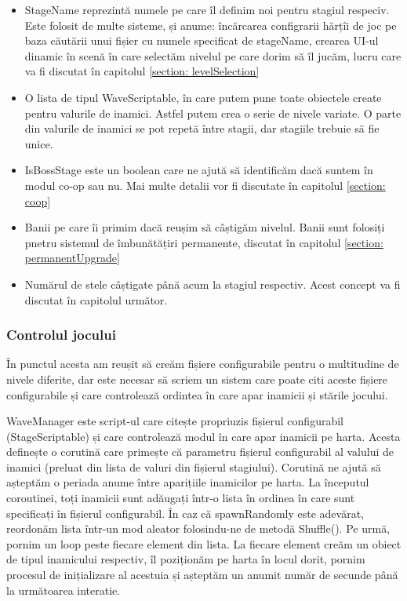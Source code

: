 \documentclass[12pt, a4paper]{article}
\begin{document}
	\begin{itemize}
		\item StageName reprezintă numele pe care îl definim noi pentru stagiul respeciv. Este folosit de multe sisteme, și anume: încărcarea configrarii hărțîi de joc pe baza căutării unui fișier cu numele specificat de stageName, crearea UI-ul dinamic în scenă în care selectăm nivelul pe care dorim să îl jucăm, lucru care va fi discutat în capitolul \ref{section: levelSelection}
		\item O lista de tipul WaveScriptable, în care putem pune toate obiectele create pentru valurile de inamici. Astfel putem crea o serie de nivele variate. O parte din valurile de inamici se pot repetă între stagii, dar stagiile trebuie să fie unice.
		\item IsBossStage este un boolean care ne ajută să identificăm dacă suntem în modul co-op sau nu. Mai multe detalii vor fi discutate în capitolul \ref{section: coop} 
		\item Banii pe care îi primim dacă reușim să câștigăm nivelul. Banii sunt folosiți pnetru sistemul de îmbunătățiri permanente, discutat în capitolul \ref{section: permanentUpgrade}
		\item Numărul de stele câștigate până acum la stagiul respectiv. Acest concept va fi discutat în capitolul următor.
	\end{itemize}
	
	
	
	
	
	\subsubsection{Controlul jocului}
	\label{section: gameState}
	
	În punctul acesta am reușit să creăm fișiere configurabile pentru o multitudine de nivele diferite, dar este necesar să scriem un sistem care poate citi aceste fișiere configurabile și care controlează ordintea în care apar inamicii și stările jocului.
	\newline
	
	WaveManager este script-ul care citește propriuzis fișierul configurabil (StageScriptable) și care controlează modul în care apar inamicii pe harta. Acesta definește o corutină care primește că parametru fișierul configurabil al valului de inamici (preluat din lista de valuri din fișierul stagiului). Corutină ne ajută să așteptăm o periada anume între aparițiile inamicilor pe harta. La începutul coroutinei, toți inamicii sunt adăugați într-o lista în ordinea în care sunt specificați în fișierul configurabil. În caz că spawnRandomly este adevărat, reordonăm lista într-un mod aleator folosindu-ne de metodă Shuffle(). Pe urmă, pornim un loop peste fiecare element din lista. La fiecare element creăm un obiect de tipul inamicului respectiv, îl poziționăm pe harta în locul dorit, pornim procesul de inițializare al acestuia și așteptăm un anumit număr de secunde până la următoarea interatie.
	\newline
	
\end{document}
